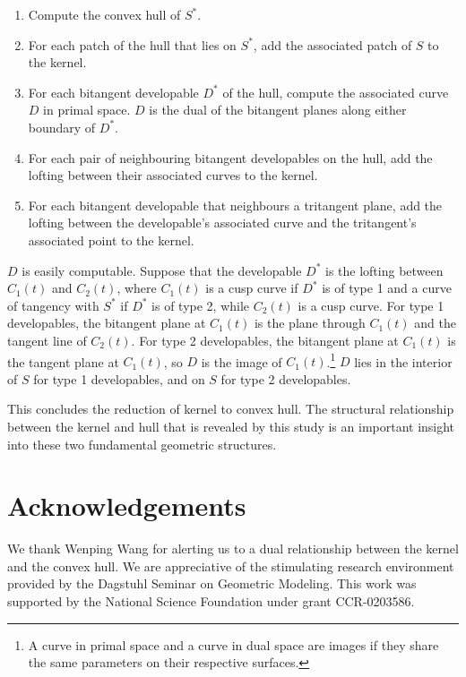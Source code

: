 \documentclass[12pt]{article}
\begin{document}
\begin{enumerate}
\item Compute the convex hull of $S^*$.
\item For each patch of the hull that lies on $S^*$, add the associated patch of $S$
	to the kernel.
\item For each bitangent developable $D^*$ of the hull, compute the associated curve $D$ in primal space.
	$D$ is the dual of the bitangent planes along either boundary of $D^*$.
\item For each pair of neighbouring bitangent developables on the hull,
	add the lofting between their associated curves to the kernel.
\item For each bitangent developable that neighbours a tritangent plane,
	add the lofting between the developable's associated curve and the tritangent's 
	associated point to the kernel.
\end{enumerate}

$D$ is easily computable.
Suppose that the developable $D^*$ is the lofting between $C_1(t)$ and $C_2(t)$,
where $C_1(t)$ is a cusp curve if $D^*$ is of type 1 and
a curve of tangency with $S^*$ if $D^*$ is of type 2,
while $C_2(t)$ is a cusp curve.
For type 1 developables, the bitangent plane at $C_1(t)$ is the plane through
$C_1(t)$ and the tangent line of $C_2(t)$.
For type 2 developables, the bitangent plane at $C_1(t)$ is the tangent plane
at $C_1(t)$, so $D$ is the image of $C_1(t)$.\footnote{A curve in primal
	space and a curve in dual space are images if they share the same
	parameters on their respective surfaces.}
$D$ lies in the interior of $S$ for type 1 developables,
and on $S$ for type 2 developables.

This concludes the reduction of kernel to convex hull.
The structural relationship between the kernel and hull that is revealed
by this study is an important insight into these two fundamental geometric structures.

\section{Acknowledgements}

We thank Wenping Wang for alerting us to a dual relationship between the kernel
and the convex hull.
We are appreciative of the stimulating research environment provided by the Dagstuhl
Seminar on Geometric Modeling.
This work was supported by the National Science Foundation under 
grant CCR-0203586.
\end{document}
